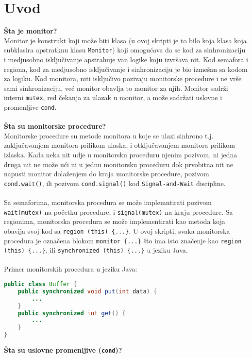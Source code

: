 \section{Uvod}
\textbf{\v{S}ta je monitor?}\\
Monitor je konstrukt koji mo\v{z}e biti klasa (u ovoj skripti je to bilo koja klasa koja subklasira apstratknu klasu \texttt{Monitor}) koji omogu\'{c}ava da se kod za sinhronizaciju i medjusobno isklju\v{c}ivanje apstrahuje van logike koju izvr\v{s}ava nit. Kod semafora i regiona, kod za medjusobno isklju\v{c}ivanje i sinhronizaciju je bio izme\v{s}an sa kodom za logiku. Kod monitora, niti isklju\v{c}ivo pozivaju monitorske procedure i ne vr\v{s}e sami sinhronizaciju, ve\'{c} monitor obavlja to monitor za njih. Monitor sadr\v{z}i interni \texttt{mutex}, red \v{c}ekanja za ulazak u monitor, a mo\v{z}e sadr\v{z}ati uslovne i promenljive \texttt{cond}.
\\\\
\textbf{\v{S}ta su monitorske procedure?}\\
Monitorske procedure su metode monitora u koje se ulazi sinhrono t.j. zaklju\v{c}avanjem monitora prilikom ulaska, i otklju\v{c}avanjem monitora prilikom izlaska. Kada neka nit udje u monitorsku proceduru njenim pozivom, ni jedna druga nit ne mo\v{z}e u\'{c}i ni u jednu monitorsku proceduru dok prvobitna nit ne napusti monitor dola\v{z}enjem do kraja monitorske procedure, pozivom \texttt{cond.wait()}, ili pozivom \texttt{cond.signal()} kod \texttt{Signal-and-Wait} discipline.
\\\\
Sa semaforima, monitorska procedura se mo\v{z}e implemntirati pozivom \texttt{wait(mutex)} na po\v{c}etku procedure, i \texttt{signal(mutex)} na kraju procedure. Sa regionima, monitorska procedura se mo\v{z}e implementirati kao metoda koja obavija svoj kod sa \texttt{region (this) \{...\}}. U ovoj skripti, svaka monitorska procedura je ozna\v{c}ena blokom \texttt{monitor \{...\}} \v{s}to ima isto zna\v{c}enje kao \texttt{region (this) \{...\}}, ili \texttt{synchronized (this) \{...\}} u jeziku Java.\\\\
Primer monitorskih procedura u jeziku Java:
\begin{lstlisting}[language=java]
public class Buffer {
    public synchronized void put(int data) {
        ...
    }
    public synchronized int get() {
        ...
    }
}
\end{lstlisting}
\textbf{\v{S}ta su uslovne promenljive (\texttt{cond})?}\\
